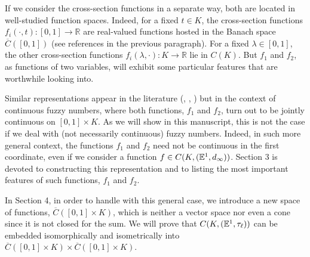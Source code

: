 \documentclass{amsart}
\newcommand{\R}{{\mathbb{R}}}
\newcommand{\fn}{\mathbb{E}\sp{1}}
\begin{document}
If we consider the cross-section functions in a separate way, both are located in well-studied function spaces. Indeed, for a fixed $t\in K$, the cross-section functions $f_i(\cdot,t):[0,1]\rightarrow \R$  are real-valued functions hosted in the Banach space  $\overline{C}([0,1])$ (see references in the previous paragraph). For a fixed $\lambda\in [0,1]$, the other cross-section functions $f_i(\lambda,\cdot):K\rightarrow\R$ lie in $C(K)$. But $f_1$ and $f_2$, as functions of two variables, will exhibit some particular features that are worthwhile looking into.




%

Similar representations appear in the literature (\cite{RL:18}, \cite{ACA:13}, \cite{chen}) but in the context of continuous fuzzy numbers, where both functions, $f_1$ and $f_2$, turn out to be jointly continuous on $[0,1]\times K$.  As we will show in this manuscript, this is not the case if we deal with (not necessarily continuous) fuzzy numbers. Indeed, in such more general context, the functions $f_1$ and $f_2$ need not be continuous in the first coordinate, even if we consider a function $f\in C(K,(\fn,d_{\infty}))$. Section 3 is devoted to constructing this representation and to listing the most important features of such functions, $f_1$ and $f_2$.

In Section 4, in order to handle with this general case, we introduce a new space of functions, $\overline{C}([0,1]\times K)$,
 which is neither a vector space nor even a cone since it is not closed for the sum.
We will prove that $C(K,(\fn,\tau_{\ell}))$
can be embedded isomorphically and isometrically into $\overline{C}([0,1]\times K)\times \overline{C}([0,1]\times K)$.
\end{document}
